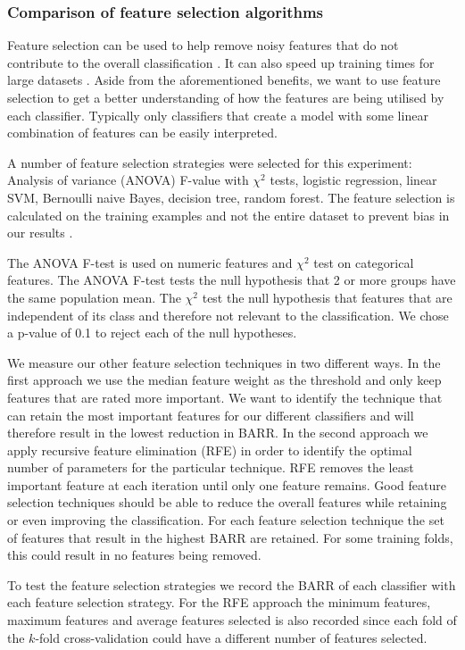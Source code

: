 \documentclass{sig-alternate-05-2015}
\begin{document}
	\subsubsection{Comparison of feature selection algorithms}
	Feature selection can be used to help remove noisy features that do not contribute to the overall classification \cite{Guyon:2003:IVF:944919.944968}. It can also speed up training times for large datasets \cite{Guyon:2003:IVF:944919.944968}. Aside from the aforementioned benefits, we want to use feature selection to get a better understanding of how the features are being utilised by each classifier. Typically only classifiers that create a model with some linear combination of features can be easily interpreted.
	
	A number of feature selection strategies were selected for this experiment: Analysis of variance (ANOVA) F-value with $\chi^2$ tests, logistic regression, linear SVM, Bernoulli naive Bayes, decision tree, random forest. The feature selection is calculated on the training examples and not the entire dataset to prevent bias in our results \cite{PMID:25988841}.
	
	The ANOVA F-test is used on numeric features and $\chi^2$ test on categorical features. The ANOVA F-test tests the null hypothesis that 2 or more groups have the same population mean. The $\chi^2$ test the null hypothesis that features that are independent of its class and therefore not relevant to the classification. We chose a p-value of 0.1 to reject each of the null hypotheses. 
	
	We measure our other feature selection techniques in two different ways. In the first approach we use the median feature weight as the threshold and only keep features that are rated more important. We want to identify the technique that can retain the most important features for our different classifiers and will therefore result in the lowest reduction in BARR. In the second approach we apply recursive feature elimination (RFE) in order to identify the optimal number of parameters for the particular technique. RFE removes the least important feature at each iteration until only one feature remains. Good feature selection techniques should be able to reduce the overall features while retaining or even improving the classification. For each feature selection technique the set of features that result in the highest BARR are retained. For some training folds, this could result in no features being removed. 
	
	To test the feature selection strategies we record the BARR of each classifier with each feature selection strategy. For the RFE approach the minimum features, maximum features and average features selected is also recorded since each fold of the $k$-fold cross-validation could have a different number of features selected.
	
\end{document}
